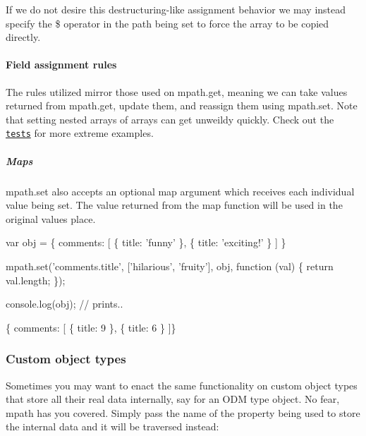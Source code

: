 If we do not desire this destructuring-\/like assignment behavior we may instead specify the {\ttfamily \$} operator in the path being set to force the array to be copied directly.




\paragraph*{Field assignment rules}

The rules utilized mirror those used on {\ttfamily mpath.\+get}, meaning we can take values returned from {\ttfamily mpath.\+get}, update them, and reassign them using {\ttfamily mpath.\+set}. Note that setting nested arrays of arrays can get unweildy quickly. Check out the \href{https://github.com/aheckmann/mpath/blob/master/test/index.js}{\tt tests} for more extreme examples.

\subparagraph*{Maps}

{\ttfamily mpath.\+set} also accepts an optional {\ttfamily map} argument which receives each individual value being set. The value returned from the {\ttfamily map} function will be used in the original values place.


\begin{DoxyCode}
var obj = \{
    comments: [
      \{ title: 'funny' \},
      \{ title: 'exciting!' \}
    ]
\}

mpath.set('comments.title', ['hilarious', 'fruity'], obj, function (val) \{
  return val.length;
\});

console.log(obj); // prints..

  \{ comments: [
      \{ title: 9 \},
      \{ title: 6 \}
  ]\}
\end{DoxyCode}


\subsubsection*{Custom object types}

Sometimes you may want to enact the same functionality on custom object types that store all their real data internally, say for an O\+DM type object. No fear, {\ttfamily mpath} has you covered. Simply pass the name of the property being used to store the internal data and it will be traversed instead\+:


